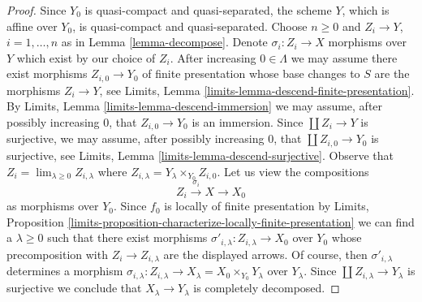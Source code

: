 \documentclass[10pt,a4paper]{amsart}
\theoremstyle{plain}
\theoremstyle{definition}
\theoremstyle{remark}
\numberwithin{equation}{subsection}
\def\lim{\mathop{\mathrm{lim}}\nolimits}
\begin{document}
\begin{proof}
Since $Y_0$ is quasi-compact and quasi-separated, the scheme $Y$,
which is affine over $Y_0$, is quasi-compact and quasi-separated.
Choose $n \geq 0$ and $Z_i \to Y$, $i = 1, \ldots, n$ as in
Lemma \ref{lemma-decompose}. Denote $\sigma_i : Z_i \to X$
morphisms over $Y$ which exist by our choice of $Z_i$.
After increasing $0 \in \Lambda$ we may assume there exist
morphisms $Z_{i, 0} \to Y_0$ of finite presentation
whose base changes to $S$ are the morphisms $Z_i \to Y$, see
Limits, Lemma \ref{limits-lemma-descend-finite-presentation}.
By Limits, Lemma \ref{limits-lemma-descend-immersion}
we may assume, after possibly increasing $0$, that $Z_{i, 0} \to Y_0$
is an immersion. Since $\coprod Z_i \to Y$ is surjective, we may assume,
after possibly increasing $0$, that
$\coprod Z_{i, 0} \to Y_0$ is surjective, see
Limits, Lemma \ref{limits-lemma-descend-surjective}. Observe that
$Z_i = \lim_{\lambda \geq 0} Z_{i, \lambda}$
where $Z_{i, \lambda} = Y_\lambda \times_{Y_0} Z_{i, 0}$.
Let us view the compositions
$$
Z_i \xrightarrow{\sigma_i} X \to X_0
$$
as morphisms over $Y_0$. Since $f_0$ is locally of finite
presentation by Limits, Proposition
\ref{limits-proposition-characterize-locally-finite-presentation}
we can find a $\lambda \geq 0$ such that there exist
morphisms $\sigma'_{i, \lambda} : Z_{i, \lambda} \to X_0$
over $Y_0$ whose precomposition with $Z_i \to Z_{i, \lambda}$
are the displayed arrows. Of course, then $\sigma'_{i, \lambda}$
determines a morphism $\sigma_{i, \lambda} : Z_{i, \lambda} \to
X_\lambda = X_0 \times_{Y_0} Y_\lambda$ over $Y_\lambda$.
Since $\coprod Z_{i, \lambda} \to Y_\lambda$ is surjective
we conclude that $X_\lambda \to Y_\lambda$ is completely decomposed.
\end{proof}
\end{document}
